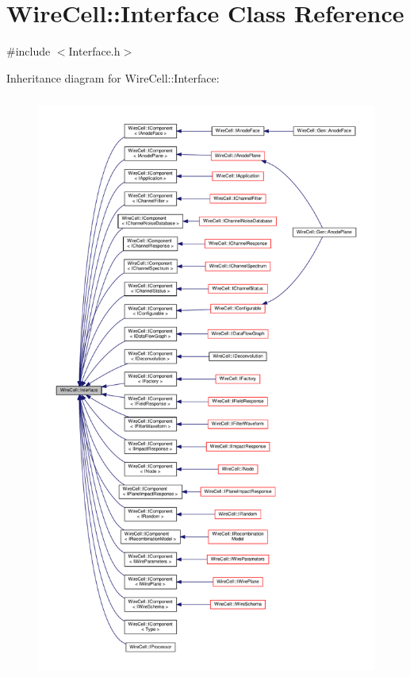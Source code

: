 \hypertarget{class_wire_cell_1_1_interface}{}\section{Wire\+Cell\+:\+:Interface Class Reference}
\label{class_wire_cell_1_1_interface}


{\ttfamily \#include $<$Interface.\+h$>$}



Inheritance diagram for Wire\+Cell\+:\+:Interface\+:
\nopagebreak
\begin{figure}[H]
\begin{center}
\leavevmode
\includegraphics[height=550pt]{class_wire_cell_1_1_interface__inherit__graph}
\end{center}
\end{figure}
